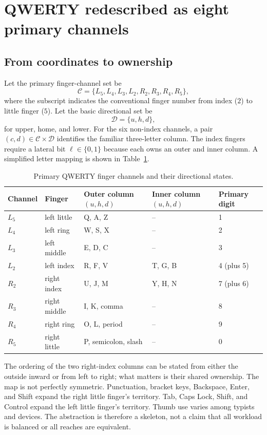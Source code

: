\documentclass[11pt]{article}
\newcommand{\chan}{\mathcal{C}}
\newcommand{\dirn}{\mathcal{D}}
\begin{document}
\section{QWERTY redescribed as eight primary channels}

\subsection{From coordinates to ownership}

Let the primary finger-channel set be
\[
\chan=\{L_5,L_4,L_3,L_2,R_2,R_3,R_4,R_5\},
\]
where the subscript indicates the conventional finger number from index ($2$) to little finger ($5$). Let the basic directional set be
\[
\dirn=\{u,h,d\},
\]
for upper, home, and lower. For the six non-index channels, a pair $(c,d)\in\chan\times\dirn$ identifies the familiar three-letter column. The index fingers require a lateral bit $\ell\in\{0,1\}$ because each owns an outer and inner column. A simplified letter mapping is shown in Table~\ref{tab:channels}.

\begin{table}[ht]
\centering
\small
\caption{Primary QWERTY finger channels and their directional states.}
\label{tab:channels}
\begin{tabular}{@{}lllll@{}}
\toprule
Channel & Finger & Outer column $(u,h,d)$ & Inner column $(u,h,d)$ & Primary digit \\
\midrule
$L_5$ & left little & Q, A, Z & -- & 1 \\
$L_4$ & left ring & W, S, X & -- & 2 \\
$L_3$ & left middle & E, D, C & -- & 3 \\
$L_2$ & left index & R, F, V & T, G, B & 4 (plus 5) \\
$R_2$ & right index & U, J, M & Y, H, N & 7 (plus 6) \\
$R_3$ & right middle & I, K, comma & -- & 8 \\
$R_4$ & right ring & O, L, period & -- & 9 \\
$R_5$ & right little & P, semicolon, slash & -- & 0 \\
\bottomrule
\end{tabular}
\end{table}

The ordering of the two right-index columns can be stated from either the outside inward or from left to right; what matters is their shared ownership. The map is not perfectly symmetric. Punctuation, bracket keys, Backspace, Enter, and Shift expand the right little finger's territory. Tab, Caps Lock, Shift, and Control expand the left little finger's territory. Thumb use varies among typists and devices. The abstraction is therefore a skeleton, not a claim that all workload is balanced or all reaches are equivalent.
\end{document}
